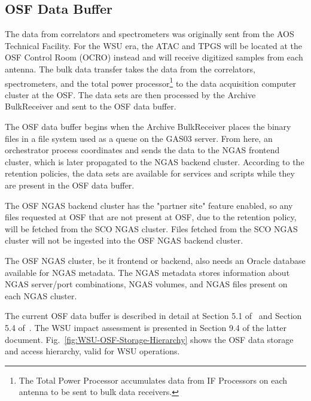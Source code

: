 \subsection{OSF Data Buffer} %
\label{osf_data_buffer}
The data from correlators and spectrometers was originally sent from the AOS Technical Facility. For the WSU era, the ATAC and TPGS will be located at the OSF Control Room (OCRO) instead and will receive digitized samples from each antenna. The bulk data transfer takes the data from the correlators, spectrometers, and the total power processor\footnote{The Total Power Processor accumulates data from IF Processors on each antenna to be sent to bulk data receivers.} to the data acquisition computer cluster at the OSF. The data sets are then processed by the Archive BulkReceiver and sent to the OSF data buffer.

The OSF data buffer begins when the Archive BulkReceiver places the binary files in a file system used as a queue on the GAS03 server. From here, an orchestrator process coordinates and sends the data to the NGAS frontend cluster, which is later propagated to the NGAS backend cluster. According to the retention policies, the data sets are available for services and scripts while they are present in the OSF data buffer.

The OSF NGAS backend cluster has the "partner site" feature enabled, so any files requested at OSF that are not present at OSF, due to the retention policy, will be fetched from the SCO NGAS cluster. Files fetched from the SCO NGAS cluster will not be ingested into the OSF NGAS backend cluster.

The OSF NGAS cluster, be it frontend or backend, also needs an Oracle database available for NGAS metadata. The NGAS metadata stores information about NGAS server/port combinations, NGAS volumes, and NGAS files present on each NGAS cluster.

The current OSF data buffer is described in detail at Section 5.1 of~\cite{dtas} and Section 5.4 of~\cite{CSA-IA}. The WSU impact assessment is presented in Section 9.4 of the latter document. Fig.~\ref{fig:WSU-OSF-Storage-Hierarchy} shows the OSF data storage and access hierarchy, valid for WSU operations.

